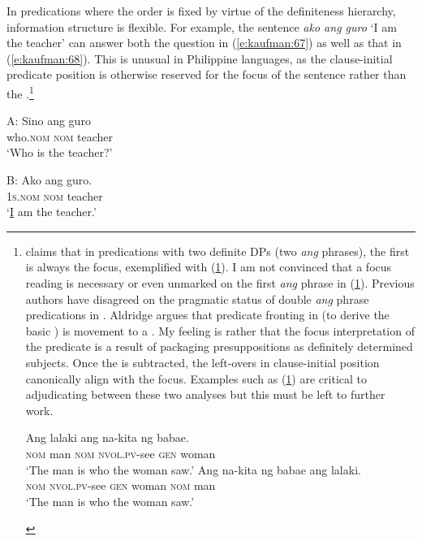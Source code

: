 \documentclass[output=paper]{langsci/langscibook}
\begin{document}
\noindent
In predications where the order is fixed by virtue of the definiteness hierarchy, information structure is flexible. For example, the sentence \textit{ako ang guro} `I am the teacher' can answer both the question in (\ref{e:kaufman:67}) as well as that in (\ref{e:kaufman:68}). This is unusual in Philippine languages, as the clause-initial predicate position is otherwise reserved for the focus of the sentence rather than the .\footnote{\citet{Aldridge:2013} claims that in predications with two definite DPs (two \textit{ang} phrases), the first is always the focus, exemplified with (\ref{e:kaufman:68.5}). I am not convinced that a focus reading is necessary or even unmarked on the first \textit{ang} phrase in (\ref{e:kaufman:68.5b}). Previous authors have disagreed on the pragmatic status of double \textit{ang} phrase predications in . Aldridge argues that predicate fronting in  (to derive the basic ) is movement to a . My feeling is rather that the focus interpretation of the predicate is a result of packaging presuppositions as definitely determined subjects. Once the  is subtracted, the left-overs in clause-initial position canonically align with the focus. Examples such as (\ref{e:kaufman:68.5}) are critical to adjudicating between these two analyses but this must be left to further work.

\begin{exe}
	\ex \label{e:kaufman:68.5}
	\begin{xlist}
		\ex\label{e:kaufman:68.5a}
        \gll {\ob}Ang lalaki{\cb} ang na-kita ng babae.\\
		\textsc{nom} man \textsc{nom} \textsc{nvol.pv}-see \textsc{gen} woman\\
		\glt `The man is who the woman saw.'
		\ex\label{e:kaufman:68.5b}
        \gll {\ob}Ang na-kita ng babae{\cb} ang lalaki.\\
		\textsc{nom} \textsc{nvol.pv}-see \textsc{gen} woman \textsc{nom} man\\
		\glt `The man is who the woman saw.'
	\end{xlist}
\end{exe}}

\begin{exe}
\label{e:kaufman:67}
		\ex\label{e:kaufman:67a}
        \gll A: Sino ang guro{\USQMark}\\
		\phantom{A:} who.\textsc{nom} \textsc{nom} teacher\\
		\glt `Who is the teacher?'
		
		\label{e:kaufman:67b}\gll B: Ako ang guro.\\
		\phantom{B:} \textsc{1s.nom} \textsc{nom} teacher\\
		\glt `\uline{I} am the teacher.'
\end{exe}
\end{document}
